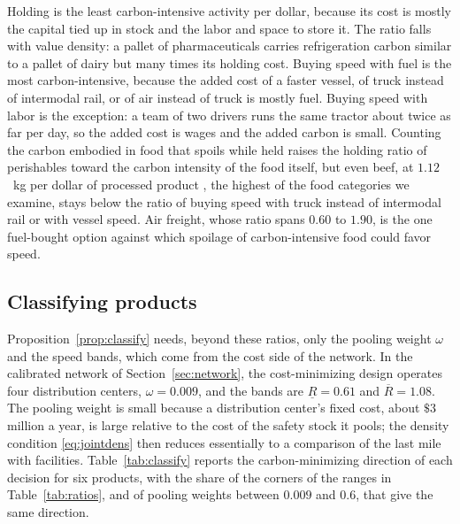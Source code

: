 \documentclass[11pt]{article}
\theoremstyle{definition}
\theoremstyle{remark}
\theoremstyle{plain}
\begin{document}
Holding is the least carbon-intensive activity per dollar, because its cost is mostly the capital tied up in
stock and the labor and space to store it. The ratio falls with value density: a pallet of pharmaceuticals
carries refrigeration carbon similar to a pallet of dairy but many times its holding cost. Buying speed with
fuel is the most carbon-intensive, because the added cost of a faster vessel, of truck instead of intermodal
rail, or of air instead of truck is mostly fuel. Buying speed with labor is the exception: a team of two drivers
runs the same tractor about twice as far per day, so the added cost is wages and the added carbon is small.
Counting the carbon embodied in food that spoils while held raises the holding ratio of perishables toward the
carbon intensity of the food itself, but even beef, at $1.12$~kg per dollar of processed product
\citep{epa2024useeio}, the highest of the food categories we examine, stays below the ratio of buying speed
with truck instead of intermodal rail or with vessel speed. Air freight, whose ratio spans $0.60$ to $1.90$, is
the one fuel-bought option against which spoilage of carbon-intensive food could favor speed.

\subsection{Classifying products}\label{sec:classify}

Proposition~\ref{prop:classify} needs, beyond these ratios, only the pooling weight $\omega$ and the speed
bands, which come from the cost side of the network. In the calibrated network of Section~\ref{sec:network},
the cost-minimizing design operates four distribution centers, $\omega=0.009$, and the bands are
$\underline R=0.61$ and $\overline R=1.08$. The pooling weight is small because a distribution center's fixed
cost, about $\$3$ million a year, is large relative to the cost of the safety stock it pools; the density
condition \eqref{eq:jointdens} then reduces essentially to a comparison of the last mile with facilities.
Table~\ref{tab:classify} reports the carbon-minimizing direction of each decision for six products, with the
share of the corners of the ranges in Table~\ref{tab:ratios}, and of pooling weights between $0.009$ and
$0.6$, that give the same direction.
\end{document}
